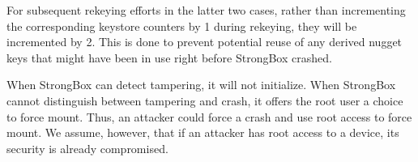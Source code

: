 For subsequent rekeying efforts in the latter two cases, rather than
incrementing the corresponding keystore counters by 1 during rekeying,
they will be incremented by 2. This is done to prevent potential reuse
of any derived nugget keys that might have been in use right before
StrongBox crashed.

When StrongBox can detect tampering, it will not initialize. When StrongBox
cannot distinguish between tampering and crash, it offers the root user a choice
to force mount. Thus, an attacker could force a crash and use root access to
force mount. We assume, however, that if an attacker has root access to a
device, its security is already compromised.
